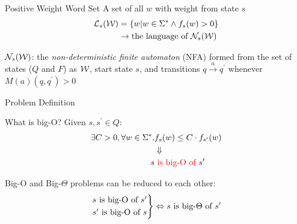 \documentclass[aspectratio=169]{beamer}
\begin{document}
\begin{frame}{Positive Weight Word Set}
    A set of all $w$ with  weight from state $s$
    $$\begin{aligned}
            {\cal L}_s({\cal W}) & = \{w | w \in \Sigma^* \land f_s(w) > 0\}        \\
                                 & \to \text{the language of } {\cal N}_s({\cal W})
        \end{aligned}$$

    \begin{block}{}

        ${\cal N}_s({\cal W})$: the
        \textit{non-deterministic finite automaton} (NFA) formed from the  set of states ($Q$ and $F$) as $\cal W$, start state $s$, and transitions $q \xrightarrow{a} q^\prime$ whenever $M(a)(q,q^\prime) > 0$
    \end{block}
\end{frame}

\begin{frame}{Problem Definition}
    \begin{block}{What is big-O?}
        Given $s,s^\prime \in Q$:
        $$
            \begin{aligned} \exists C>0, \forall w \in \Sigma^*, & f_s(w) \le C \cdot f_{s^\prime}(w)  \\
                                                     & \Downarrow                          \\
                s                                    & \text{ {\color{red}{is big-O of}} } s^\prime
            \end{aligned}
        $$
    \end{block}

    Big-O and Big-$\Theta$ problems can be reduced to each other:
    $$
        \begin{rcases}
            s \text{ is big-O of } s^\prime \\
            s^\prime \text{ is big-O of } s
        \end{rcases}
        \Leftrightarrow s \text{ is big-}\Theta \text{ of } s^\prime
    $$
\end{frame}
\end{document}
